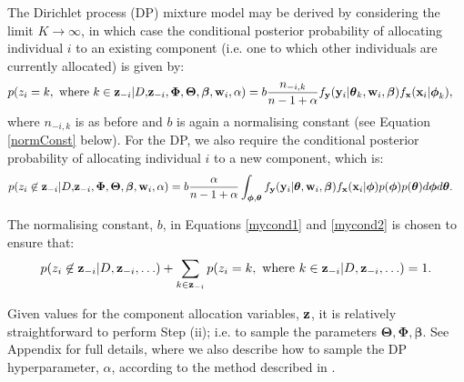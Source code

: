 \documentclass[12pt]{article}
\begin{document}
The Dirichlet process (DP) mixture model may be derived by considering the limit $K \rightarrow \infty$, in which case the conditional posterior probability of allocating individual $i$ to an existing component (i.e. one to which other individuals are currently allocated) is given by:
%
%
%
\begin{align}
p(z_i = k, \mbox{ where } k \in {\bf z}_{-i} |D,&{\bf z}_{-i}, \boldsymbol{\Phi}, \boldsymbol{\Theta}, \boldsymbol{\beta}, {\bf w}_i, \alpha)= b\frac{n_{-i,k}}{n - 1 + \alpha} f_{\bf y}({\bf y}_i|\boldsymbol{\theta}_k, {\bf w}_i, \boldsymbol{ \beta})f_{\bf x}({\bf x}_i | \boldsymbol{\phi}_{k}), \label{mycond1}
\end{align}
where $n_{-i,k}$ is as before and $b$ is again a normalising constant (see Equation \eqref{normConst} below).  For the DP, we also require the conditional posterior probability of allocating individual $i$ to a new component, which is:
\begin{align}
p(z_i \not \in {\bf z}_{-i} |D,&{\bf z}_{-i}, \boldsymbol{\Phi}, \boldsymbol{\Theta}, \boldsymbol{\beta}, {\bf w}_i, \alpha)= b\frac{\alpha}{n - 1 + \alpha} \int_{\boldsymbol{\phi}, \boldsymbol{\theta}}f_{\bf y}({\bf y}_i|\boldsymbol{\theta}, {\bf w}_i, \boldsymbol{ \beta})f_{\bf x}({\bf x}_i | \boldsymbol{\phi}) p(\boldsymbol{\phi})p(\boldsymbol{\theta}) d\boldsymbol{\phi} d\boldsymbol{\theta}.\label{mycond2}
\end{align}

The normalising constant, $b$, in Equations \eqref{mycond1} and \eqref{mycond2} is chosen to ensure that: 
\begin{equation}
p(z_i \not \in {\bf z}_{-i} |D,{\bf z}_{-i}, \ldots) + \sum_{k \in {\bf z}_{-i}} p(z_i = k, \mbox{ where } k \in {\bf z}_{-i} |D,{\bf z}_{-i}, \ldots) = 1. \label{normConst}
\end{equation}

Given values for the component allocation variables, ${\bf z}$, it is relatively straightforward to perform Step (ii); i.e. to sample the parameters $\boldsymbol{\Theta}, \boldsymbol{\Phi},\boldsymbol{\beta}$. See Appendix for full details, where we also describe how to sample the DP hyperparameter, $\alpha$, according to the method described in \citet{Escobar1995}.   


\end{document}
